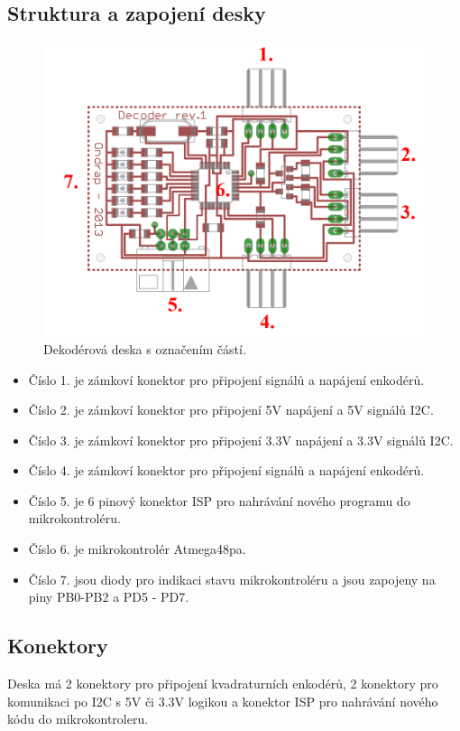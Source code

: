 \documentclass[a4paper,11pt]{article}
\begin{document}
\newpage
\subsection{Struktura a zapojení desky}

\begin{figure}[htbp]
	\centering
		\includegraphics{dekoderyDeskaOznacena.png}
	\caption{Dekodérová deska s označením částí.}
	\label{fig:dekoderyDeska}
\end{figure}


\begin{itemize}
	\item Číslo 1. je zámkoví konektor pro připojení signálů a napájení enkodérů.
	\item Číslo 2. je zámkoví konektor pro připojení 5V napájení a 5V signálů I2C.
	\item Číslo 3. je zámkoví konektor pro připojení 3.3V napájení a 3.3V signálů I2C.
	\item Číslo 4. je zámkoví konektor pro připojení signálů a napájení enkodérů.
	\item Číslo 5. je 6 pinový konektor ISP pro nahrávání nového programu do mikrokontroléru.
	\item Číslo 6. je mikrokontrolér Atmega48pa.
	\item Číslo 7. jsou diody pro indikaci stavu mikrokontroléru a jsou zapojeny na piny PB0-PB2 a PD5 - PD7.
\end{itemize}

\newpage
\subsection{Konektory}
Deska má 2 konektory pro připojení kvadraturních enkodérů, 2 konektory pro komunikaci po I2C s 5V či 3.3V logikou a konektor ISP pro nahrávání nového kódu do mikrokontroleru.
\end{document}
